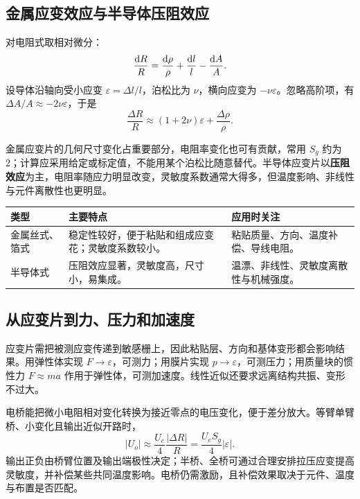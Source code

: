 \subsection{金属应变效应与半导体压阻效应}
对电阻式取相对微分：
\[
\frac{\mathrm{d} R}{R}=\frac{\mathrm{d}\rho}{\rho}
+\frac{\mathrm{d} l}{l}-\frac{\mathrm{d} A}{A}.
\]
设导体沿轴向受小应变 $\varepsilon=\Delta l/l$，泊松比为 $\nu$，横向应变为 $-\nu\varepsilon$。忽略高阶项，有 $\Delta A/A\approx-2\nu\varepsilon$，于是
\[
\frac{\Delta R}{R}\approx(1+2\nu)\varepsilon
+\frac{\Delta\rho}{\rho}.
\]

金属应变片的几何尺寸变化占重要部分，电阻率变化也可有贡献，常用 $S_g$ 约为2；计算应采用给定或标定值，不能用某个泊松比随意替代。半导体应变片以\textbf{压阻效应}为主，电阻率随应力明显改变，灵敏度系数通常大得多，但温度影响、非线性与元件离散性也更明显。

\begin{table}[H]
\centering\small
\begin{tabularx}{\linewidth}{@{}l X X@{}}
\toprule
类型 & 主要特点 & 应用时关注 \\
\midrule
金属丝式、箔式 & 稳定性较好，便于粘贴和组成应变花；灵敏度系数较小。 & 粘贴质量、方向、温度补偿、导线电阻。 \\
半导体式 & 压阻效应显著，灵敏度高，尺寸小，易集成。 & 温漂、非线性、灵敏度离散性与机械强度。 \\
\bottomrule
\end{tabularx}
\end{table}

\subsection{从应变片到力、压力和加速度}
应变片需把被测应变传递到敏感栅上，因此粘贴层、方向和基体变形都会影响结果。用弹性体实现 $F\to\varepsilon$，可测力；用膜片实现 $p\to\varepsilon$，可测压力；用质量块的惯性力 $F\approx ma$ 作用于弹性体，可测加速度。线性近似还要求远离结构共振、变形不过大。

电桥能把微小电阻相对变化转换为接近零点的电压变化，便于差分放大。等臂单臂桥、小变化且输出近似开路时，
\[
\boxed{|U_o|\approx\frac{U_e}{4}\frac{|\Delta R|}{R}
=\frac{U_eS_g}{4}|\varepsilon|}.
\]
输出正负由桥臂位置及输出端极性决定；半桥、全桥可通过合理安排拉压应变提高灵敏度，并补偿某些共同温度影响。电桥仍需激励，且补偿效果取决于元件、温度与布置是否匹配。

